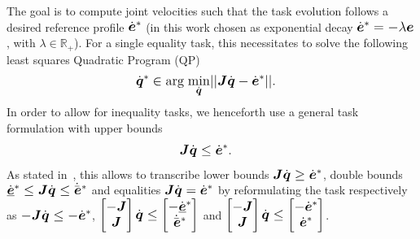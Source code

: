 The goal is to compute joint velocities such that the task evolution follows a desired reference
profile $\dot{\mbm{e}}^*$ (in this work chosen as exponential decay $\dot{\mbm{e}}^*= -\lambda
\mbm{e}$, with $\lambda \in \mathbb{R}_+$). For a single equality task, this necessitates to solve
the following least squares Quadratic Program (QP)
%
\begin{align}\label{eq:QP}
  \dot{\mbm{q}}^* &\in \mbox{arg} \; \underset{\footnotesize\dot{\mbm{q}}\normalsize}{\mbox{min}}||\mbm{J}\dot{\mbm{q}}-\dot{\mbm{e}}^*||.
\end{align}
%
In order to allow for inequality tasks, we henceforth use a general task formulation with upper
bounds 
\begin{align}\label{eq:task}
  \mbm{J}\dot{\mbm{q}}&\leq \dot{\mbm{e}}^*.
\end{align}
%
As stated in~\cite{Esca14}, this allows to transcribe lower bounds \mbox{$\mbm{J}\dot{\mbm{q}} \geq
  \dot{\mbm{e}}^*$,} double bounds \mbox{$\dot{\underline{\mbm{e}}}^* \leq \mbm{J}\dot{\mbm{q}} \leq
  \dot{\bar{\mbm{e}}}^*$} and equalities \mbox{$\mbm{J}\dot{\mbm{q}}=\dot{\mbm{e}}^*$} by
reformulating the task respectively as
\mbox{$-\mbm{J}\dot{\mbm{q}} \leq -\dot{\mbm{e}}^*$,} $\begin{bmatrix} -\mbm{J} \\
  \mbm{J} \end{bmatrix}\dot{\mbm{q}} \leq \begin{bmatrix} -\dot{\underline{\mbm{e}}}^*
  \\ \dot{\bar{\mbm{e}}}^* \end{bmatrix}$ and $\begin{bmatrix} -\mbm{J} \\
  \mbm{J} \end{bmatrix}\dot{\mbm{q}} \leq \begin{bmatrix} -\dot{\mbm{e}}^* \\
  \dot{\mbm{e}}^* \end{bmatrix}$.

